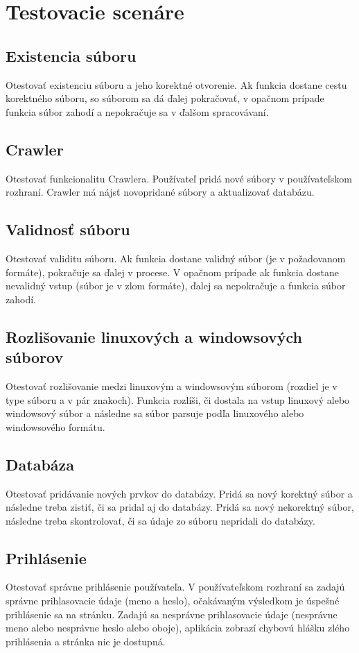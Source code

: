 \documentclass[12pt,a4paper, draft]{article}
\begin{document}
\section*{Testovacie scenáre}
\subsection*{Existencia súboru}
Otestovať existenciu súboru a jeho korektné otvorenie. Ak funkcia dosta\-ne cestu korektného súboru, so súborom sa dá ďalej pokračovať, v opačnom prípade funkcia súbor zahodí a nepokračuje sa v ďalšom spracovávaní.

\subsection*{Crawler}
Otestovať funkcionalitu Crawlera. Používateľ pridá nové súbory v používateľskom rozhraní. Crawler má nájsť novopridané súbory a aktualizovať databázu. 

\subsection*{Validnosť súboru}
Otestovať validitu súboru. Ak funkcia dostane validný súbor (je v požado\-vanom formáte), pokračuje sa ďalej v procese. V opačnom prípade ak funkcia dostane nevalidný vstup (súbor je v zlom formáte), ďalej sa nepokračuje a funkcia súbor zahodí.

\subsection*{Rozlišovanie linuxových a windowsových súborov}
Otestovať rozlišovanie medzi linuxovým a windowsovým súborom (rozdiel je v type súboru a v pár znakoch). Funkcia rozlíši, či dostala na vstup linu\-xový alebo windowsový súbor a následne sa súbor parsuje podľa linuxového alebo windowsového formátu.  

\subsection*{Databáza}
Otestovať pridávanie nových prvkov do databázy. Pridá sa nový korektný súbor a následne treba zistiť, či sa pridal aj do databázy. Pridá sa nový nekorektný súbor, následne treba skontrolovať, či sa údaje zo súboru nepridali do databázy.

\subsection*{Prihlásenie}
Otestovať správne prihlásenie používateľa. V používateľskom rozhraní sa zadajú správne prihlasovacie údaje (meno a heslo), očakávaným výsledkom je úspešné prihlásenie sa na stránku. Zadajú sa nesprávne prihlasovacie údaje (nesprávne meno alebo nesprávne heslo alebo oboje), aplikácia zobrazí chybovú hlášku zlého prihlásenia a stránka nie je dostupná. 
\end{document}
